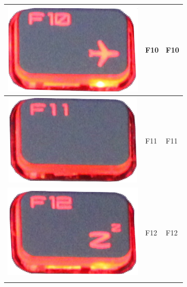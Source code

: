 \begin{longtable}{|cll|}
\hline
\begin{minipage}[c]{.3\textwidth}
\vspace{0.2cm}
\includegraphics[scale=0.06]{Images/KeyMapping/F10}
\vspace{0.2cm}
\end{minipage} & F10 & F10\\
\hline
\begin{minipage}[c]{.3\textwidth}
\vspace{0.2cm}
\includegraphics[scale=0.06]{Images/KeyMapping/F11}
\vspace{0.2cm}
\end{minipage} & F11 & F11\\
\hline
\begin{minipage}[c]{.3\textwidth}
\vspace{0.2cm}
\includegraphics[scale=0.06]{Images/KeyMapping/F12}
\vspace{0.2cm}
\end{minipage} & F12 & F12\\
\hline
\begin{minipage}[c]{.3\textwidth}
\vspace{0.2cm}

\end{minipage}
\end{longtable}
